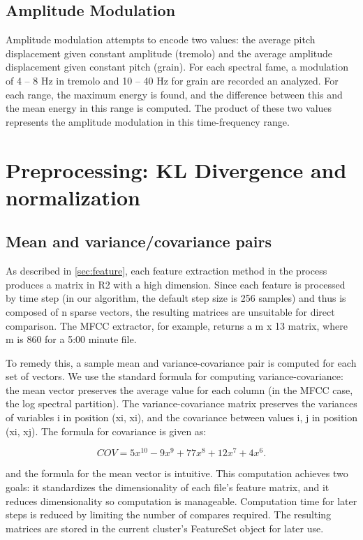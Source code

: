 \documentclass[10pt,twocolumn]{article}
\begin{document}
\subsection{Amplitude Modulation}

Amplitude modulation attempts to encode two values: the average pitch displacement given constant amplitude (tremolo) and the average amplitude displacement given constant pitch (grain). \cite{Eronen} For each spectral fame, a modulation of 4 – 8 Hz in tremolo and 10 – 40 Hz for grain are recorded an analyzed. For  each range, the maximum energy is found, and the difference between this and the mean energy in this range is computed. \cite{yaafe} The product of these two values represents the amplitude modulation in this time-frequency range.


\section{Preprocessing: KL Divergence and normalization}
\label{sec:preprocessing}


\subsection{Mean and variance/covariance pairs}

As described in \ref{sec:feature}, each feature extraction method in the process produces a matrix in R2 with a high dimension. Since each feature is processed by time step (in our algorithm, the default step size is 256 samples) and thus is composed of n sparse vectors, the resulting matrices are unsuitable for direct comparison. The MFCC extractor, for example, returns a m x 13 matrix, where m is 860 for a 5:00 minute file. 


To remedy this, a sample mean and variance-covariance pair is computed for each set of vectors. We use the standard formula for computing variance-covariance: the mean vector preserves the average value for each column (in the MFCC case, the log spectral partition). The variance-covariance matrix preserves the variances of variables i in position (xi, xi), and the covariance between values i, j in position (xi, xj). The formula for covariance is given as:

$$
COV = 5x^{10}-9x^9 + 77x^8 + 12x^7 + 4x^6.
$$

and the formula for the mean vector is intuitive. This computation achieves two goals: it standardizes the dimensionality of each file’s feature matrix, and it reduces dimensionality so computation is manageable. Computation time for later steps is reduced by limiting the number of compares required. The resulting matrices are stored in the current cluster’s FeatureSet object for later use.
\end{document}
